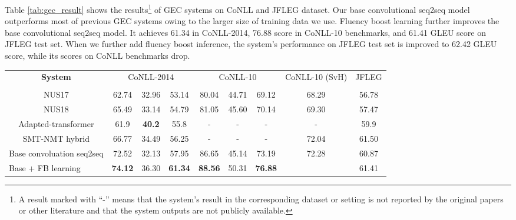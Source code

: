 \documentclass{article} \usepackage{MSRA_TR,times}
\begin{document}
Table \ref{tab:gec_result} shows the results\footnote{A result marked with ``-'' means that the system's result in the corresponding dataset or setting is not reported by the original papers or other literature and that the system outputs are not publicly available.} of GEC systems on CoNLL and JFLEG dataset. Our base convolutional seq2seq model outperforms most of previous GEC systems owing to the larger size of training data we use. Fluency boost learning further improves the base convolutional seq2seq model. It achieves 61.34 in CoNLL-2014, 76.88  score in CoNLL-10 benchmarks, and 61.41 GLEU score on JFLEG test set. When we further add fluency boost inference, the system's performance on JFLEG test set is improved to 62.42 GLEU score, while its  scores on CoNLL benchmarks drop.

\begin{table}[t]
\small
\scalebox{0.9}
{
\begin{tabular}{c|ccc|ccc|c|c}
\hline
\multirow{2}{*}{\bf System}                              & \multicolumn{3}{c|}{CoNLL-2014}                   & \multicolumn{3}{c|}{CoNLL-10}                     & CoNLL-10 (SvH) & JFLEG          \\ 
                                                     &               &               &               &               &               &               &               &            \\ \hline
NUS17                                                & 62.74          & 32.96          & 53.14          & 80.04              & 44.71              & 69.12          & 68.29          & 56.78          \\
NUS18                                                & 65.49          & 33.14          & 54.79          & 81.05              & 45.60              & 70.14              & 69.30              & 57.47          \\
Adapted-transformer &  61.9 & \bf 40.2 & 55.8 & - & - & - & - & 59.9 \\
SMT-NMT hybrid                                       & 66.77          & 34.49          & 56.25          & -              & -              & -          & 72.04             & 61.50          \\ \hline
\multicolumn{1}{l|}{Base convoluation seq2seq}        & 72.52          & 32.13          & 57.95          & 86.65          & 45.14          & 73.19          & 72.28          & 60.87          \\
\multicolumn{1}{l|}{Base + FB learning}               & \textbf{74.12} & 36.30          & \textbf{61.34} & \textbf{88.56} & 50.31          & \textbf{76.88} & \color{red}{\textbf{75.93}} & 61.41          \\

\end{tabular}}
\end{table}
\end{document}
